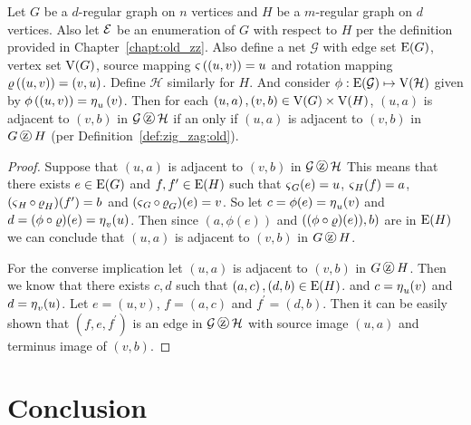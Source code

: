 \begin{theorem}
\label{thm:old_new}
Let $G$ be a $d$-regular graph on $n$ vertices and $H$ be a $m$-regular graph on $d$ vertices. Also let $\operatorname{\mathcal{E}}$ be an enumeration of $G$ with respect to $H$ per the definition provided in Chapter~\ref{chapt:old_zz}. Also define a net $\mathcal{G}$ with edge set $\mathrm{E}(G) $, vertex set $\mathrm{V}(G)$, source mapping $\operatorname{\mathbf{\varsigma}}\left( \left(u,v\right)\right) = u$ and rotation mapping $\operatorname{\mathbf{\varrho}}\left(\left(u,v\right)\right) = \left(v,u\right)$. Define $\mathcal{H}$ similarly for $H$. And consider $\phi:\mathrm{E}(\mathcal{G})  \mapsto \mathrm{V}(\mathcal{H})$ given by $\phi\left((u,v)\right) = \operatorname{\eta}_u\left(v\right)$. Then for each $\left(u,a\right), \left(v,b\right) \in \mathrm{V}(G) \times \mathrm{V}(H)$, $(u,a)$ is adjacent to $(v,b)$ in $\mathcal{G} \zigzag \mathcal{H}$ if an only if $\left(u,a\right)$ is adjacent to $(v,b)$ in $G \zigzag H$ (per Definition~\ref{def:zig_zag:old}).  
\end{theorem}

\begin{proof}
Suppose that $\left(u, a\right)$ is adjacent to $\left(v, b \right)$ in $\mathcal{G} \zigzag \mathcal{H}$ This means that there exists $e \in \mathrm{E}(G) $ and $f,f^{\prime} \in \mathrm{E}(H) $ such that $\operatorname{\mathbf{\varsigma}}_G(e) = u$, $\operatorname{\mathbf{\varsigma}}_{H}(f) = a$, $(\operatorname{\mathbf{\varsigma}}_H \circ \operatorname{\mathbf{\varrho}}_H)(f^{\prime}) = b$ and $(\operatorname{\mathbf{\varsigma}}_G \circ \operatorname{\mathbf{\varrho}}_G)(e) = v$. So let $c = \phi(e) = \operatorname{\eta}_u(v) $ and $d = (\phi \circ \operatorname{\mathbf{\varrho}})(e) = \operatorname{\eta}_v(u)$. Then since $\left(a, \phi(e)\right)$ and $\left((\phi \circ \operatorname{\mathbf{\varrho}})(e)), b\right)$ are in  $\mathrm{E}(H) $ we can conclude that $\left(u, a\right)$ is adjacent to $\left(v, b\right)$ in $G\zigzag H$.

For the converse implication let $\left(u, a\right)$ is adjacent to $\left(v, b\right)$ in $G\zigzag H$. Then we know that there exists $c,d$ such that $\left(a,c\right), \left(d,b\right) \in \mathrm{E}(H) $. and $c = \operatorname{\eta}_{u}(v)$ and $d = \operatorname{\eta}_{v}(u)$.  Let $e = \left(u,v\right)$, $f = \left(a, c \right)$ and $f^{\prime} = \left(d,b\right)$. Then it can be easily shown that $\left(f, e, f^{\prime}\right)$ is an edge in $\mathcal{G} \zigzag \mathcal{H}$ with source image $\left(u,a \right)$ and terminus image of $\left(v,b\right)$. 
\end{proof}
 
\chapter{Conclusion}


